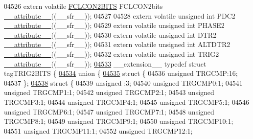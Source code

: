 \begin{DoxyCode}
04526 \textcolor{keyword}{extern} \textcolor{keyword}{volatile} \hyperlink{a00008_de/df8/a00440}{FCLCON2BITS} FCLCON2bits \hyperlink{a00009_a493c46f03454991ccc5aa7a6e1dfb2a7}{\_\_attribute\_\_}((\_\_sfr\_\_));
04527 
04528 \textcolor{keyword}{extern} \textcolor{keyword}{volatile} \textcolor{keywordtype}{unsigned} \textcolor{keywordtype}{int}  PDC2 \hyperlink{a00009_a493c46f03454991ccc5aa7a6e1dfb2a7}{\_\_attribute\_\_}((\_\_sfr\_\_));
04529 \textcolor{keyword}{extern} \textcolor{keyword}{volatile} \textcolor{keywordtype}{unsigned} \textcolor{keywordtype}{int}  PHASE2 \hyperlink{a00009_a493c46f03454991ccc5aa7a6e1dfb2a7}{\_\_attribute\_\_}((\_\_sfr\_\_));
04530 \textcolor{keyword}{extern} \textcolor{keyword}{volatile} \textcolor{keywordtype}{unsigned} \textcolor{keywordtype}{int}  DTR2 \hyperlink{a00009_a493c46f03454991ccc5aa7a6e1dfb2a7}{\_\_attribute\_\_}((\_\_sfr\_\_));
04531 \textcolor{keyword}{extern} \textcolor{keyword}{volatile} \textcolor{keywordtype}{unsigned} \textcolor{keywordtype}{int}  ALTDTR2 \hyperlink{a00009_a493c46f03454991ccc5aa7a6e1dfb2a7}{\_\_attribute\_\_}((\_\_sfr\_\_));
04532 \textcolor{keyword}{extern} \textcolor{keyword}{volatile} \textcolor{keywordtype}{unsigned} \textcolor{keywordtype}{int}  TRIG2 \hyperlink{a00009_a493c46f03454991ccc5aa7a6e1dfb2a7}{\_\_attribute\_\_}((\_\_sfr\_\_));
\hypertarget{a00009_source_l04533}{}\hyperlink{a00008}{04533} \_\_extension\_\_ \textcolor{keyword}{typedef} \textcolor{keyword}{struct }tagTRIG2BITS \{
\hypertarget{a00009_source_l04534}{}\hyperlink{a00009}{04534}   \textcolor{keyword}{union }\{
\hypertarget{a00009_source_l04535}{}\hyperlink{a00009}{04535}     \textcolor{keyword}{struct }\{
04536       \textcolor{keywordtype}{unsigned} TRGCMP:16;
04537     \};
\hypertarget{a00009_source_l04538}{}\hyperlink{a00009}{04538}     \textcolor{keyword}{struct }\{
04539       \textcolor{keywordtype}{unsigned} :3;
04540       \textcolor{keywordtype}{unsigned} TRGCMP0:1;
04541       \textcolor{keywordtype}{unsigned} TRGCMP1:1;
04542       \textcolor{keywordtype}{unsigned} TRGCMP2:1;
04543       \textcolor{keywordtype}{unsigned} TRGCMP3:1;
04544       \textcolor{keywordtype}{unsigned} TRGCMP4:1;
04545       \textcolor{keywordtype}{unsigned} TRGCMP5:1;
04546       \textcolor{keywordtype}{unsigned} TRGCMP6:1;
04547       \textcolor{keywordtype}{unsigned} TRGCMP7:1;
04548       \textcolor{keywordtype}{unsigned} TRGCMP8:1;
04549       \textcolor{keywordtype}{unsigned} TRGCMP9:1;
04550       \textcolor{keywordtype}{unsigned} TRGCMP10:1;
04551       \textcolor{keywordtype}{unsigned} TRGCMP11:1;
04552       \textcolor{keywordtype}{unsigned} TRGCMP12:1;

\end{DoxyCode}
